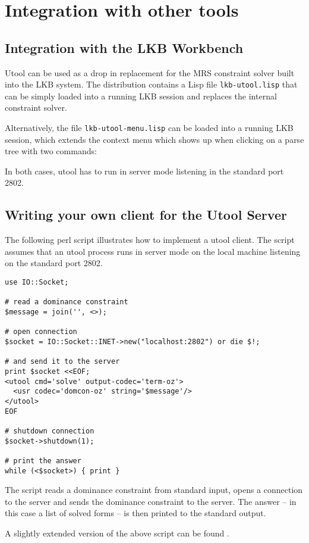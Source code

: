 \section{Integration with other tools}  \label{sec:integration}




\subsection{Integration with the LKB Workbench}
\label{sec:integration-lkb}

Utool can be used as a drop in replacement for the MRS constraint solver built into the LKB system. The distribution contains a Lisp file
\verb|lkb-utool.lisp| that can be simply loaded into a running LKB session and replaces the internal constraint solver.

Alternatively, the file \verb|lkb-utool-menu.lisp| can be loaded into a running LKB session, which extends the context menu which shows up when clicking on a parse tree with two commands:


In both cases, utool has to run in server mode listening in the standard port 2802.

\subsection{Writing your own client for the Utool Server}

The following perl script illustrates how to implement a utool client. The script assumes that an utool process runs in server mode on the local machine listening on the standard port 2802. 

\begin{verbatim}
use IO::Socket;

# read a dominance constraint
$message = join('', <>);

# open connection
$socket = IO::Socket::INET->new("localhost:2802") or die $!;

# and send it to the server
print $socket <<EOF;
<utool cmd='solve' output-codec='term-oz'>
  <usr codec='domcon-oz' string='$message'/>
</utool>
EOF

# shutdown connection
$socket->shutdown(1);

# print the answer 
while (<$socket>) { print }
\end{verbatim}

The script reads a dominance constraint from standard input, opens a connection to the server and sends the dominance constraint to the server. The answer -- in this case a list of solved forms -- is then printed to the standard output.

A slightly extended version of the above script can be found .


